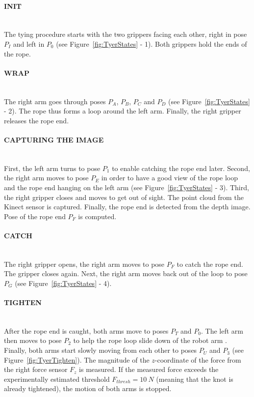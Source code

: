         \paragraph{INIT}~\\
        \noindent The tying procedure starts with the two grippers facing each other, right in pose $P_I$ and left in $P_0$ (see Figure~\ref{fig:TyerStates} - 1). Both grippers hold the ends of the rope.

        \paragraph{WRAP}~\\
        \noindent The right arm goes through poses $P_A$, $P_B$, $P_C$ and $P_D$ (see Figure~\ref{fig:TyerStates} - 2). The rope thus forms a loop around the left arm. Finally, the right gripper releases the rope end.

        \paragraph{CAPTURING THE IMAGE}~\\
        First, the left arm turns to pose $P_1$ to enable catching the rope end later. Second, the right arm moves to pose $P_E$ in order to have a good view of the rope loop and the rope end hanging on the left arm (see Figure~\ref{fig:TyerStates} - 3). Third, the right gripper closes and moves to get out of sight. The point cloud from the Kinect sensor is captured. Finally, the rope end is detected from the depth image. Pose of the rope end $P_F$ is computed.

        \paragraph{CATCH}~\\
        \noindent  The right gripper opens, the right arm moves to pose $P_F$ to catch the rope end. The gripper closes again. Next, the right arm moves back out of the loop to pose $P_G$ (see Figure~\ref{fig:TyerStates} - 4).

        \paragraph{TIGHTEN}~\\
        \noindent After the rope end is caught, both arms move to poses $P_T$ and $P_0$. The left arm then moves to pose $P_2$ to help the rope loop slide down of the robot arm . Finally, both arms start slowly moving from each other to poses $P_U$ and $P_3$ (see Figure~\ref{fig:TyerTighten}). The magnitude of the $z$-coordinate of the force from the right force sensor $F_z$ is measured. If the measured force exceeds the experimentally estimated threshold $F_{thresh} = \SI{10}{N}$ (meaning that the knot is already tightened), the motion of both arms is stopped.


